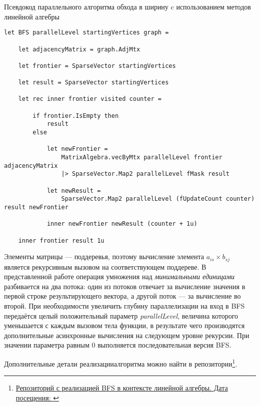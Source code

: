 \begin{algorithm}[h]
\caption{Псевдокод параллельного алгоритма обхода в ширину c использованием методов линейной алгебры}
\label{alg:bfs_example}
\begin{lstlisting}[language=pseudoFSharp]
let BFS parallelLevel startingVertices graph =

	let adjacencyMatrix = graph.AdjMtx

    let frontier = SparseVector startingVertices

    let result = SparseVector startingVertices

    let rec inner frontier visited counter =

        if frontier.IsEmpty then
            result
        else

            let newFrontier =
                MatrixAlgebra.vecByMtx parallelLevel frontier adjacencyMatrix
                |> SparseVector.Map2 parallelLevel fMask result

            let newResult =
                SparseVector.Map2 parallelLevel (fUpdateCount counter) result newFrontier

            inner newFrontier newResult (counter + 1u)

    inner frontier result 1u
\end{lstlisting}
\end{algorithm}

Элементы матрицы --- поддеревья, поэтому вычисление элемента $a_{is} \times b_{sj}$ является рекурсивным вызовом на соответствующем поддереве. В представленной работе операция умножения над \textit{минимальными единицами} разбивается на два потока: один из потоков отвечает за вычисление значения в первой строке результирующего вектора, а другой поток --- за вычисление во второй. При необходимости увеличить глубину параллелизации на вход в BFS передаётся целый положительный параметр \textit{parallelLevel}, величина которого уменьшается с каждым вызовом тела функции, в результате чего производятся дополнительные асинхронные вычисления на следующем уровне рекурсии. При значении параметра равным 0 выполняется последовательная версия BFS.


\noindent Дополнительные детали реализацииалгоритма можно найти в репозитории\footnote{\href{https://github.com/artem-burashnikov}{Репозиторий с реализацией BFS в контексте линейной алгебры. Дата посещения: }}.
